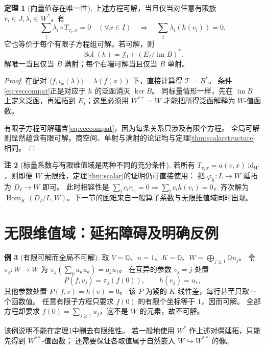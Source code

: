 \documentclass[UTF8,11pt,a4paper]{ctexart}
\theoremstyle{definition}
\newtheorem{theorem}{定理}[section]
\newtheorem{example}[theorem]{例}
\newtheorem{remark}[theorem]{注}
\newcommand{\Q}{\mathbb Q}
\newcommand{\Hom}{\operatorname{Hom}}
\newcommand{\im}{\operatorname{im}}
\newcommand{\id}{\operatorname{id}}
\newcommand{\T}{\mathcal T}
\newcommand{\Sol}{\operatorname{Sol}}
\begin{document}
\begin{theorem}[向量值存在唯一性]\label{thm:vectorfinite}
上述方程可解，当且仅当对任意有限族 $v_i\in J,\lambda_i\in W^*$，有
\begin{equation}\label{eq:veccompat}
 \sum_i\lambda_i\circ T_{v_i,x}=0\quad(\forall x\in I)
 \quad\Longrightarrow\quad
 \sum_i\lambda_i(h(v_i))=0.
\end{equation}
它也等价于每个有限子方程组可解。若可解，则
\[
 \Sol(h)=f_0+(E_I/\im B)^*.
\]
解唯一当且仅当 $B$ 满射；每个右端可解当且仅当 $B$ 单射。
\end{theorem}
\begin{proof}
在配对 $\langle f,i_x(\lambda)\rangle=\lambda(f(x))$ 下，直接计算得 $\T=B^*$。
条件\eqref{eq:veccompat}正是对应于 $h$ 的泛函消灭 $\ker B$。
同标量情形一样，先在 $\im B$ 上定义泛函，再延拓到 $E_I$；这里必须用 $W^{**}=W$ 才能把所得泛函解释为 $W$-值函数。

有限子方程可解蕴含\eqref{eq:veccompat}，因为每条关系只涉及有限个方程。
全局可解则显然蕴含有限可解。商空间、单射与满射的论证均与定理\ref{thm:scalarstructure}相同。
\end{proof}

\begin{remark}[标量系数与有限维值域是两种不同的充分条件]
若所有 $T_{v,x}=a(v,x)\id_W$，则即便 $W$ 无限维，定理\ref{thm:scalar}的证明仍可直接使用：
把 $\varphi_h:L\to W$ 延拓为 $D_I\to W$ 即可。
此时相容性是 $\sum_i c_ir_{v_i}=0\Rightarrow\sum_i c_i h(v_i)=0$，齐次解为
$\Hom_K(D_I/L,W)$。下一节的困难来自一般算子系数与无限维值域同时出现。
\end{remark}

\section{无限维值域：延拓障碍及明确反例}\label{sec:infinite}
\begin{example}[有限可解而全局不可解]\label{ex:infinite}
取 $V=\Q$、$n=1$、$K=\Q$、$W=\bigoplus_{j\ge1}\Q u_j$。
令 $\pi_j:W\to W$ 为 $\pi_j(\sum_k a_ku_k)=a_ju_1$。
在互异的参数 $v_j=j$ 处置
\[
 P(f,v_j)=\pi_j(f(0)),\qquad h(v_j)=u_1,
\]
其他参数处置 $P(f,v)=h(v)=0$。
该 $P$ 为紧的 $K$-线性差，每行甚至只取一个函数值。
任意有限子方程只要求 $f(0)$ 的有限个坐标等于 $1$，因而可解。
全部方程却要求 $f(0)=\sum_{j\ge1}u_j$，这不是 $W$ 的元素，故不可解。
\end{example}
该例说明不能在定理\ref{thm:vectorfinite}中删去有限维性。
若一般地使用 $W^*$ 作上述对偶延拓，只能先得到 $W^{**}$-值函数；
还需要保证各取值属于自然嵌入 $W\hookrightarrow W^{**}$ 的像。
\end{document}

